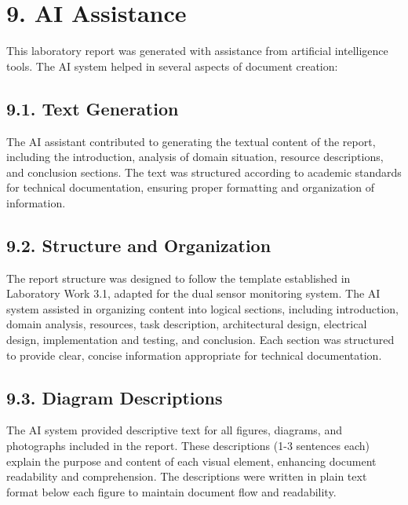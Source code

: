 \documentclass[12pt]{article}
\begin{document}
\section*{9. AI Assistance}

This laboratory report was generated with assistance from artificial intelligence tools. The AI system helped in several aspects of document creation:

\subsection*{9.1. Text Generation}

The AI assistant contributed to generating the textual content of the report, including the introduction, analysis of domain situation, resource descriptions, and conclusion sections. The text was structured according to academic standards for technical documentation, ensuring proper formatting and organization of information.

\subsection*{9.2. Structure and Organization}

The report structure was designed to follow the template established in Laboratory Work 3.1, adapted for the dual sensor monitoring system. The AI system assisted in organizing content into logical sections, including introduction, domain analysis, resources, task description, architectural design, electrical design, implementation and testing, and conclusion. Each section was structured to provide clear, concise information appropriate for technical documentation.

\subsection*{9.3. Diagram Descriptions}

The AI system provided descriptive text for all figures, diagrams, and photographs included in the report. These descriptions (1-3 sentences each) explain the purpose and content of each visual element, enhancing document readability and comprehension. The descriptions were written in plain text format below each figure to maintain document flow and readability.
\end{document}
